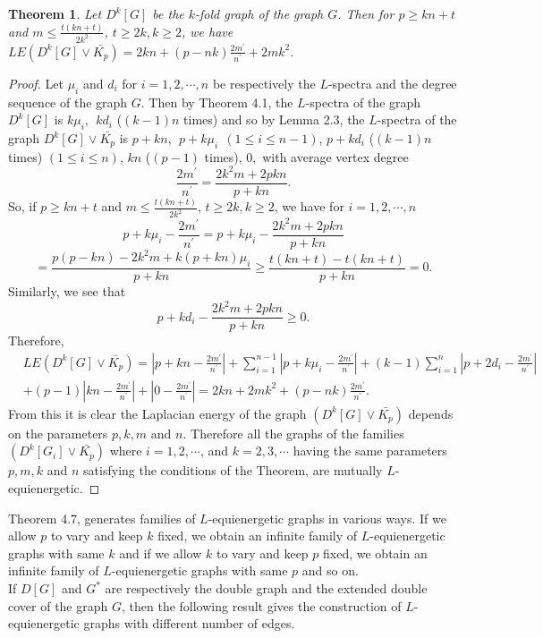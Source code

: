 \documentclass[12pt,a4paper]{amsart}
\newtheorem{theorem}{Theorem}[section]
\theoremstyle{theorem}
\theoremstyle{definition}
\numberwithin{equation}{section} \makeatletter
\begin{document}
 \begin{theorem}
 Let $D^k[G]$ be the $k$-fold graph of the graph $G$. Then for $p\geq kn+t$ and $m\leq \frac{t(kn+t)}{2k^2}$, $t\geq 2k, k\geq 2$, we have $LE(D^k[G]\vee \bar{K_p})=2kn+(p-nk)\frac{2m^{\prime}}{n^{\prime}}+2mk^2.$
 \end{theorem}
 \begin{proof}
 Let $\mu_i$ and $d_i$ for $i=1,2,\cdots,n$ be respectively the $L$-spectra and the degree sequence of the graph $G$. Then by Theorem 4.1, the $L$-spectra of the graph $D^k[G]$ is $k\mu_i,~~ kd_i$ ($(k-1)n$ times) and so by Lemma 2.3, the $L$-spectra of the graph $D^k[G]\vee \bar{K_p}$ is $ p+kn,~~ p+k\mu_i ~~(1\leq i\leq n-1)$, $p+kd_i$ ($(k-1)n$ times) $(1\leq i\leq n)$, $kn$ ($(p-1)$ times), $0,$ with average vertex degree  $$\frac{2m^{\prime}}{n^{\prime}}=\frac{2k^2m+2pkn}{p+kn}.$$
 So, if $p\geq kn+t$ and $m\leq \frac{t(kn+t)}{2k^2}$, $t\geq 2k, k\geq 2$, we have for $i=1,2,\cdots,n$
 $$p+k\mu_i-\frac{2m^{\prime}}{n^{\prime}}=p+k\mu_i-\frac{2k^2m+2pkn}{p+kn}$$
 $$=\frac{p(p-kn)-2k^2m+k(p+kn)\mu_i}{p+kn}\geq \frac{t(kn+t)-t(kn+t)}{p+kn}=0.$$
 Similarly, we see that $$p+kd_i-\frac{2k^2m+2pkn}{p+kn}\geq 0.$$
 Therefore,
 \begin{align*}
 &LE(D^k[G]\vee \bar{K_p})=|p+kn-\frac{2m^{\prime}}{n^{\prime}}|+\sum\limits_{i=1}^{n-1}|p+k\mu_i-\frac{2m^{\prime}}{n^{\prime}}|+
 (k-1)\sum\limits_{i=1}^{n}|p+2d_i-\frac{2m^{\prime}}{n^{\prime}}|\\&+(p-1)|kn-\frac{2m^{\prime}}{n^{\prime}}|+|0-\frac{2m^{\prime}}{n^{\prime}}|
 =2kn+2mk^2+(p-nk)\frac{2m^{\prime}}{n^{\prime}}.
 \end{align*}
 From this it is clear the Laplacian energy of the graph $(D^k[G]\vee \bar{K_p})$ depends on the parameters $p, k, m$ and $n$. Therefore all the graphs of the families $(D^k[G_i]\vee \bar{K_p})$ where $i=1,2,\cdots$, and $k=2,3,\cdots$ having the same parameters $p, m, k$ and $n$ satisfying the conditions of the Theorem, are mutually $L$-equienergetic.
 \end{proof}
 \indent Theorem 4.7, generates families of $L$-equienergetic graphs in various ways. If we allow $p$ to vary and keep $k$ fixed, we obtain an infinite family of $L$-equienergetic graphs with same $k$ and if we allow $k$ to vary and keep $p$ fixed, we obtain an infinite family of $L$-equienergetic graphs with same $p$ and so on.\\
 \indent If $D[G]$ and $G^*$ are respectively the double graph and the extended double cover of the graph $G$, then the following result gives the construction of $L$-equienergetic graphs with different number of edges.
\end{document}
